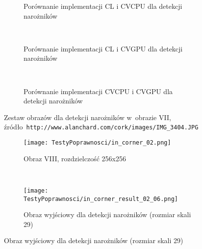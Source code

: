 \begin{itemize}
\begin{figure}[H]
\begin{subfigure}[t]{0.3\textwidth}
	\centering
	\setlength\fboxsep{0pt}
	\setlength\fboxrule{0.5pt}
	\caption{Porównanie implementacji CL i CVCPU dla detekcji narożników}
	\label{fig:valCorner1CLCVCPU}
\end{subfigure}
~
\begin{subfigure}[t]{0.3\textwidth}
	\centering
	\setlength\fboxsep{0pt}
	\setlength\fboxrule{0.5pt}
	\caption{Porównanie implementacji CL i CVGPU dla detekcji narożników}
	\label{fig:valCorner1CLCVGPU}
\end{subfigure}
~
\begin{subfigure}[t]{0.3\textwidth}
	\centering
	\setlength\fboxsep{0pt}
	\setlength\fboxrule{0.5pt}
	\caption{Porównanie implementacji CVCPU i CVGPU dla detekcji narożników}
	\label{fig:valCorner1CVCPUCVGPU}                 
\end{subfigure}
\caption{Zestaw obrazów dla detekcji narożników w~obrazie VII, \tiny{źródło~\texttt{http://www.alanchard.com/cork/images/IMG\_3404.JPG}}}

\label{fig:valCorner1}
\end{figure}

\begin{figure}[H]

\begin{center}
\begin{subfigure}[t]{0.3\textwidth}
\texttt{[image: TestyPoprawnosci/in\_corner\_02.png]}
\caption{Obraz VIII, rozdzielczość 256x256}
\label{fig:valCorner02}
\end{subfigure}
~
\begin{subfigure}[t]{0.3\textwidth}
\texttt{[image: TestyPoprawnosci/in\_corner\_result\_02\_06.png]}
\caption{Obraz wyjściowy dla detekcji narożników (rozmiar skali 29)}
\label{fig:valCornerResult02}
\end{subfigure}
\end{center}


\end{figure}
\end{itemize}
